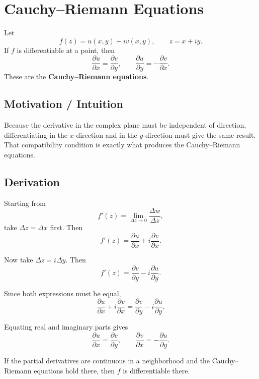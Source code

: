 
\section{Cauchy--Riemann Equations}

\begin{conceptbox}
    Let
    \[
        f(z)=u(x,y)+iv(x,y), \qquad z=x+iy.
    \]
    If $f$ is differentiable at a point, then
    \[
        \frac{\partial u}{\partial x}=\frac{\partial v}{\partial y},
        \qquad
        \frac{\partial u}{\partial y}=-\frac{\partial v}{\partial x}.
    \]
    These are the \textbf{Cauchy--Riemann equations}.
\end{conceptbox}

\subsection*{Motivation / Intuition}

Because the derivative in the complex plane must be independent of direction, differentiating in the $x$-direction and in the $y$-direction must give the same result. That compatibility condition is exactly what produces the Cauchy--Riemann equations.

\subsection*{Derivation}

Starting from
\[
    f'(z)=\lim_{\Delta z\to 0}\frac{\Delta w}{\Delta z},
\]
take $\Delta z=\Delta x$ first. Then
\[
    f'(z)=\frac{\partial u}{\partial x}+i\frac{\partial v}{\partial x}.
\]

Now take $\Delta z=i\Delta y$. Then
\[
    f'(z)=\frac{\partial v}{\partial y}-i\frac{\partial u}{\partial y}.
\]

Since both expressions must be equal,
\[
    \frac{\partial u}{\partial x}+i\frac{\partial v}{\partial x}
    =
    \frac{\partial v}{\partial y}-i\frac{\partial u}{\partial y}.
\]

Equating real and imaginary parts gives
\[
    \frac{\partial u}{\partial x}=\frac{\partial v}{\partial y},
    \qquad
    \frac{\partial v}{\partial x}=-\frac{\partial u}{\partial y}.
\]

\begin{conceptbox}
    If the partial derivatives are continuous in a neighborhood and the Cauchy--Riemann equations hold there, then $f$ is differentiable there.
\end{conceptbox}

